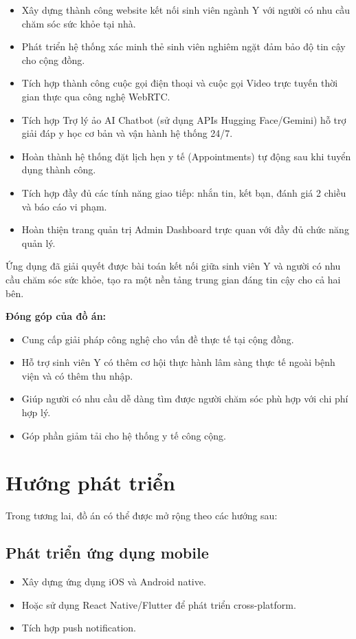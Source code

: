 \documentclass[13pt,a4paper]{extreport}
\begin{document}
\begin{itemize}
    \item Xây dựng thành công website kết nối sinh viên ngành Y với người có nhu cầu chăm sóc sức khỏe tại nhà.
    \item Phát triển hệ thống xác minh thẻ sinh viên nghiêm ngặt đảm bảo độ tin cậy cho cộng đồng.
    \item Tích hợp thành công cuộc gọi điện thoại và cuộc gọi Video trực tuyến thời gian thực qua công nghệ WebRTC.
    \item Tích hợp Trợ lý ảo AI Chatbot (sử dụng APIs Hugging Face/Gemini) hỗ trợ giải đáp y học cơ bản và vận hành hệ thống 24/7.
    \item Hoàn thành hệ thống đặt lịch hẹn y tế (Appointments) tự động sau khi tuyển dụng thành công.
    \item Tích hợp đầy đủ các tính năng giao tiếp: nhắn tin, kết bạn, đánh giá 2 chiều và báo cáo vi phạm.
    \item Hoàn thiện trang quản trị Admin Dashboard trực quan với đầy đủ chức năng quản lý.
\end{itemize}

Ứng dụng đã giải quyết được bài toán kết nối giữa sinh viên Y và người có nhu cầu chăm sóc sức khỏe, tạo ra một nền tảng trung gian đáng tin cậy cho cả hai bên.

\textbf{Đóng góp của đồ án:}
\begin{itemize}
    \item Cung cấp giải pháp công nghệ cho vấn đề thực tế tại cộng đồng.
    \item Hỗ trợ sinh viên Y có thêm cơ hội thực hành lâm sàng thực tế ngoài bệnh viện và có thêm thu nhập.
    \item Giúp người có nhu cầu dễ dàng tìm được người chăm sóc phù hợp với chi phí hợp lý.
    \item Góp phần giảm tải cho hệ thống y tế công cộng.
\end{itemize}

\section{Hướng phát triển}

Trong tương lai, đồ án có thể được mở rộng theo các hướng sau:

\subsection{Phát triển ứng dụng mobile}
\begin{itemize}
    \item Xây dựng ứng dụng iOS và Android native.
    \item Hoặc sử dụng React Native/Flutter để phát triển cross-platform.
    \item Tích hợp push notification.
\end{itemize}
\end{document}
